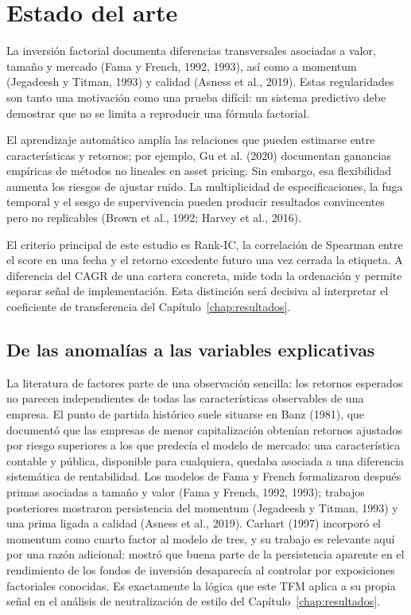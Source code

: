 \chapter{Estado del arte}

La inversión factorial documenta diferencias transversales asociadas a valor, tamaño y mercado
(Fama y French, 1992, 1993), así como a momentum (Jegadeesh y Titman, 1993) y
calidad (Asness et al., 2019). Estas regularidades son tanto una motivación como una prueba
difícil: un sistema predictivo debe demostrar que no se limita a reproducir una fórmula factorial.

El aprendizaje automático amplía las relaciones que pueden estimarse entre características y
retornos; por ejemplo, Gu et al. (2020) documentan ganancias empíricas de métodos no
lineales en asset pricing. Sin embargo, esa flexibilidad aumenta los riesgos de ajustar ruido.
La multiplicidad de especificaciones, la fuga temporal y el sesgo de supervivencia pueden producir
resultados convincentes pero no replicables (Brown et al., 1992; Harvey et al., 2016).

El criterio principal de este estudio es Rank-IC, la correlación de Spearman entre el score en una
fecha y el retorno excedente futuro una vez cerrada la etiqueta. A diferencia del CAGR de una
cartera concreta, mide toda la ordenación y permite separar señal de implementación. Esta distinción
será decisiva al interpretar el coeficiente de transferencia del Capítulo~\ref{chap:resultados}.

\section{De las anomalías a las variables explicativas}

La literatura de factores parte de una observación sencilla: los retornos esperados no parecen
independientes de todas las características observables de una empresa. El punto de partida
histórico suele situarse en Banz (1981), que documentó que las empresas de menor capitalización
obtenían retornos ajustados por riesgo superiores a los que predecía el modelo de mercado: una
característica contable y pública, disponible para cualquiera, quedaba asociada a una diferencia
sistemática de rentabilidad. Los modelos de Fama y French formalizaron después primas asociadas a
tamaño y valor (Fama y French, 1992, 1993); trabajos
posteriores mostraron persistencia del momentum (Jegadeesh y Titman, 1993) y una prima ligada
a calidad (Asness et al., 2019). Carhart (1997) incorporó el momentum como cuarto factor
al modelo de tres, y su trabajo es relevante aquí por una razón adicional: mostró que buena parte
de la persistencia aparente en el rendimiento de los fondos de inversión desaparecía al controlar
por exposiciones factoriales conocidas. Es exactamente la lógica que este TFM aplica a su propia
señal en el análisis de neutralización de estilo del Capítulo~\ref{chap:resultados}.

